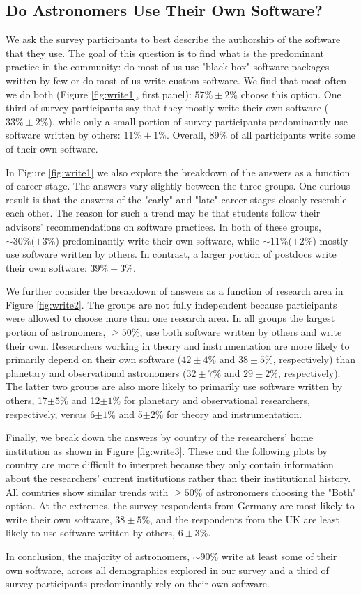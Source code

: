\subsection{Do Astronomers Use Their Own Software?}
\label{ssec:own}

We ask the survey participants to best describe the authorship of the software that they use. The goal of this question is to find what is the predominant practice in the community: do most of us use "black box" software packages written by few or do most of us write custom software. We find that most often we do both (Figure \ref{fig:write1}, first panel): $57\%\pm2\%$ choose this option. One third of survey participants say that they mostly write their own software ($33\%\pm2\%$), while only a small portion of survey participants predominantly use software written by others: $11\%\pm1\%$. Overall, 89\% of all participants write some of their own software.

In Figure \ref{fig:write1} we also explore the breakdown of the answers as a function of career stage. The answers vary slightly between the three groups. One curious result is that the answers of the "early" and "late" career stages closely resemble each other. The reason for such a trend may be that students follow their advisors' recommendations on software practices. In both of these groups, $\sim30\%(\pm3\%$) predominantly write their own software, while $\sim11\%(\pm2\%$) mostly use software written by others. In contrast, a larger portion of postdocs write their own software: $39\%\pm3\%$. 

We further consider the breakdown of answers as a function of research area in Figure \ref{fig:write2}. The groups are not fully independent because participants were allowed to choose more than one research area. In all groups the largest portion of astronomers, $\ge50\%$, use both software written by others and write their own. Researchers working in theory and instrumentation are more likely to primarily depend on their own software ($42\pm4\%$ and $38\pm5\%$, respectively) than planetary and observational astronomers ($32\pm7\%$ and $29\pm2\%$, respectively). The latter two groups are also more likely to primarily use software written by others, 17$\pm5\%$ and 12$\pm1\%$ for planetary and observational researchers, respectively, versus 6$\pm1\%$ and 5$\pm2\%$ for theory and instrumentation.

Finally, we break down the answers by country of the researchers' home institution as shown in Figure \ref{fig:write3}. These and the following plots by country are more difficult to interpret because they only contain information about the researchers' current institutions rather than their institutional history. All countries show similar trends with $\ge50\%$ of astronomers choosing the "Both" option. At the extremes, the survey respondents from Germany are most likely to write their own software, $38\pm5\%$, and the respondents from the UK are least likely to use software written by others, $6\pm3\%$.

In conclusion, the majority of astronomers, $\sim90\%$ write at least some of their own software, across all demographics explored in our survey and a third of survey participants predominantly rely on their own software.  
    
    
    